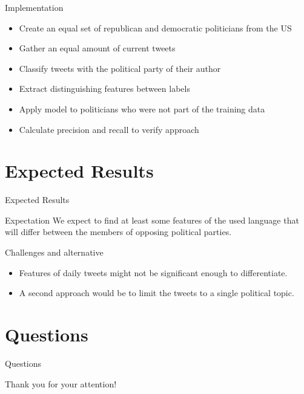 \documentclass[aspectratio=169,xcolor=dvipsnames]{beamer}
\begin{document}
\begin{frame}{Implementation}
    \begin{example}
        \begin{itemize}
            \item Create an equal set of republican and democratic politicians from the US
            \item Gather an equal amount of current tweets 
            \item Classify tweets with the political party of their author
            \item Extract distinguishing features between labels
            \item Apply model to politicians who were not part of the training data
            \item Calculate precision and recall to verify approach
        \end{itemize}
    \end{example}
\end{frame}

\section{Expected Results}

\begin{frame}{Expected Results}
    \begin{block}{Expectation}
        We expect to find at least some features of the used language that will differ between the members of opposing political parties. 
    \end{block}
    
    \begin{alertblock}{Challenges and alternative}
        \begin{itemize}
            \item Features of daily tweets might not be significant enough to differentiate.
            \item A second approach would be to limit the tweets to a single political topic.
        \end{itemize}
    \end{alertblock}
\end{frame}

\section{Questions}

\begin{frame}{Questions}
    \Huge{\centerline{Thank you for your attention!}}
\end{frame}

\end{document}

